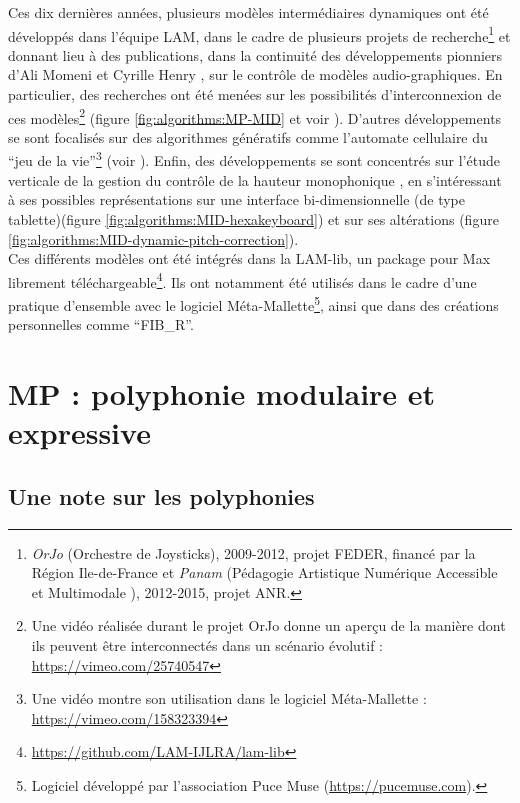 \noindent Ces dix dernières années, plusieurs modèles intermédiaires dynamiques ont été développés dans l'équipe \gls{LAM}, dans le cadre de plusieurs projets de recherche\footnote{\textit{OrJo} (Orchestre de Joysticks), 2009-2012, projet FEDER, financé par la Région Ile-de-France et \textit{Panam} (Pédagogie Artistique Numérique Accessible et Multimodale ), 2012-2015, projet \gls{ANR}.} et donnant lieu à des publications, dans la continuité des développements pionniers d'Ali Momeni et Cyrille Henry \cite{momeni_dynamic_2006}, sur le contrôle de modèles audio-graphiques. En particulier, des recherches ont été menées sur les possibilités d'interconnexion de ces modèles\footnote{Une vidéo réalisée durant le projet OrJo donne un aperçu de la manière dont ils peuvent être interconnectés dans un scénario évolutif : \url{https://vimeo.com/25740547}} (figure \ref{fig:algorithms:MP-MID} et voir \cite{goudard_dynamic_2011}). D'autres développements se sont focalisés sur des algorithmes génératifs comme l'automate cellulaire du ``jeu de la vie''\footnote{Une vidéo montre son utilisation dans le logiciel Méta-Mallette : \url{https://vimeo.com/158323394}} (voir \cite{goudard_modeintermediaire_2012}). Enfin, des développements se sont concentrés sur l'étude verticale de la gestion du contrôle de la hauteur monophonique \cite{goudard_playing_2014}, en s'intéressant à ses possibles représentations sur une interface bi-dimensionnelle (de type tablette)(figure \ref{fig:algorithms:MID-hexakeyboard}) et sur ses altérations (figure \ref{fig:algorithms:MID-dynamic-pitch-correction}).\\
\indent Ces différents modèles ont été intégrés dans la LAM-lib, un package pour Max librement téléchargeable\footnote{\url{https://github.com/LAM-IJLRA/lam-lib}}. Ils ont notamment été utilisés dans le cadre d'une pratique d'ensemble avec le logiciel Méta-Mallette\footnote{Logiciel développé par l'association Puce Muse (\url{https://pucemuse.com}).}, ainsi que dans des créations personnelles comme ``FIB\_R''.


\section{MP : polyphonie modulaire et expressive}
\label{sec:algorithms:MP}
\subsection{Une note sur les polyphonies}

